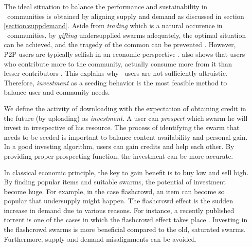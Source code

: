 The ideal situation to balance the performance and sustainability in \bt~communities is obtained by aligning supply and demand as discussed in section \ref{section:suppdemand}. Aside from \textit{trading} which is a natural occurence in \bt~communities, by \textit{gifting} undersupplied swarms adequately, the optimal situation can be achieved, and the tragedy of the common can be prevented \cite{2002:reputationtotragedy:milinski}. However, P2P users are typically selfish in an economic perspective \cite{2014:userbehaviourprivate:jia}. \citeauthor{2009:demandsupplyres:andrade} also shows that users who contribute more to the community, actually consume more from it than lesser contributors \cite{2009:demandsupplyres:andrade}. This explains why \bt~users are not sufficiently altruistic. Therefore, \textit{investment} as a seeding behavior is the most feasible method to balance user and community needs.

We define the activity of downloading with the expectation of obtaining credit in the future (by uploading) as \textit{investment}. A user can \textit{prospect} which swarm he will invest in irrespective of his resource. The process of identifying the swarm that needs to be seeded is important to balance content availability and personal gain. In a good investing algorithm, users can gain credits and help each other. By providing proper prospecting function, the investment can be more accurate.


In classical economic principle, the key to gain benefit is to buy low and sell high. By finding popular items and suitable swarms, the potential of investment become huge. For example, in the case flashcrowd, an item can become so popular that undersupply might happen. The flashcrowd effect is the sudden increase in demand due to various reasons. For instance, a recently published torrent is one of the cases in which the flashcrowd effect takes place \cite{2013:swarmevolution:su}. Investing in the flashcrowd swarms is more beneficial compared to the old, saturated swarms. Furthermore, supply and demand misalignments can be avoided.

